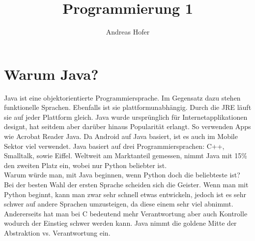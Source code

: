 \documentclass{article}
\title{\vspace{-1cm}Programmierung 1}
\author{Andreas Hofer}
\begin{document}
	\maketitle
	\tableofcontents
	\newpage
	\section{Warum Java?}
	\preto{\@verbatim}{\topsep=0pt \partopsep=0pt }
	Java ist eine objektorientierte Programmiersprache. Im Gegensatz dazu stehen funktionelle Sprachen. Ebenfalls ist sie plattformunabhängig. Durch die JRE läuft sie auf jeder Plattform gleich. Java wurde ursprünglich für Internetapplikationen designt, hat seitdem aber darüber hinaus Popularität erlangt. So verwenden Apps wie Acrobat Reader Java. Da Android auf Java basiert, ist es auch im Mobile Sektor viel verwendet. Java basiert auf drei Programmiersprachen: C++, Smalltalk, sowie Eiffel. Weltweit am Marktanteil gemessen, nimmt Java mit 15\% den zweiten Platz ein, wobei nur Python beliebter ist. \\
	Warum würde man, mit Java beginnen, wenn Python doch die beliebteste ist? \\
	Bei der besten Wahl der ersten Sprache scheiden sich die Geister. Wenn man mit Python beginnt, kann man zwar sehr schnell etwas entwickeln, jedoch ist es sehr schwer auf andere Sprachen umzusteigen, da diese einem sehr viel abnimmt. Andererseits hat man bei C bedeutend mehr Verantwortung aber auch Kontrolle wodurch der Einstieg schwer werden kann. Java nimmt die goldene Mitte der Abstraktion vs. Verantwortung ein. \\
\end{document}
